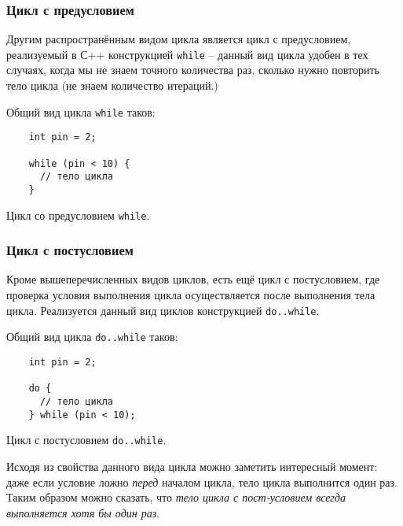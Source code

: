 \documentclass[../sparc.tex]{subfiles}
\begin{document}
\subsubsection{Цикл с предусловием}

Другим распространённым видом цикла является цикл с предусловием, реализуемый в
С++ конструкцией \texttt{while} -- данный вид цикла удобен в тех случаях, когда
мы не знаем точного количества раз, сколько нужно повторить тело цикла (не знаем
количество итераций.)

Общий вид цикла \texttt{while} таков:

\begin{listing}[ht]
  \begin{verbatim}
    int pin = 2;

    while (pin < 10) {
      // тело цикла
    }
  \end{verbatim}
  \label{listing:dialogues-with-computer-while}
  \caption{Цикл со предусловием \texttt{while}.}
\end{listing}

\subsubsection{Цикл с постусловием}

Кроме вышеперечисленных видов циклов, есть ещё цикл с постусловием, где
проверка условия выполнения цикла осуществляется после выполнения тела цикла.
Реализуется данный вид циклов конструкцией \texttt{do..while}.

Общий вид цикла \texttt{do..while} таков:

\begin{listing}[ht]
  \begin{verbatim}
    int pin = 2;

    do {
      // тело цикла
    } while (pin < 10);
  \end{verbatim}
  \label{listing:dialogues-with-computer-do-while}
  \caption{Цикл с постусловием \texttt{do..while}.}
\end{listing}

Исходя из свойства данного вида цикла можно заметить интересный момент: даже
если условие ложно \emph{перед} началом цикла, тело цикла выполнится один раз.
Таким образом можно сказать, что \emph{тело цикла с пост-условием всегда
выполняется хотя бы один раз}.
\end{document}
